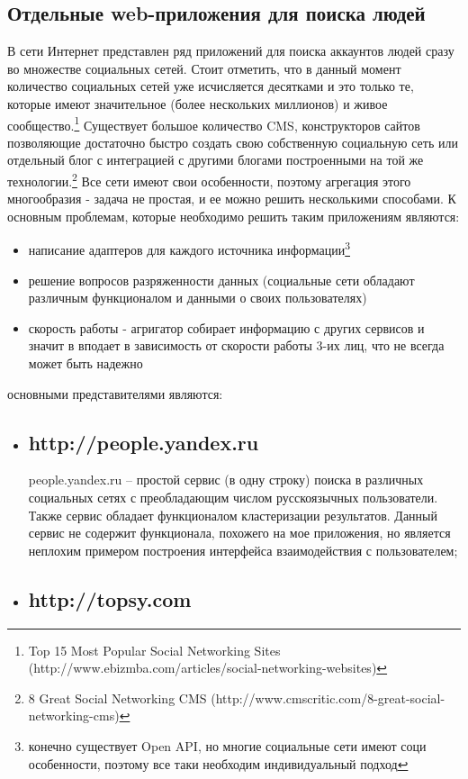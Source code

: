 \begin{chap1}
\subsection{Отдельные web-приложения для поиска людей}
В сети Интернет представлен ряд приложений для поиска аккаунтов людей сразу во множестве социальных сетей. Стоит отметить, что в данный момент количество социальных сетей уже исчисляется десятками и это только те, которые имеют значительное (более нескольких миллионов) и живое сообщество.\footnote{Top 15 Most Popular Social Networking Sites (http://www.ebizmba.com/articles/social-networking-websites)}
 Существует большое количество CMS,%
конструкторов сайтов позволяющие достаточно быстро создать свою собственную социальную сеть или отдельный блог с интеграцией с другими блогами построенными на той же технологии.\footnote{8 Great Social Networking CMS (http://www.cmscritic.com/8-great-social-networking-cms)} 
Все сети имеют свои особенности,  поэтому агрегация этого многообразия - задача не простая, и ее можно решить несколькими способами. К основным проблемам, которые необходимо решить таким приложениям являются:
\begin{itemize}
\item написание адаптеров для каждого источника информации\footnote{конечно существует Open API, но многие социальные сети имеют соци особенности, поэтому все таки необходим индивидуальный подход}
\item решение вопросов разряженности данных (социальные сети обладают различным функционалом и данными о своих пользователях)
\item скорость работы - агригатор собирает информацию с других сервисов и значит в вподает в зависимость от скорости работы 3-их лиц, что не всегда может быть надежно
\end{itemize}
основными представителями являются:
\begin{itemize}
\item \subsection{http://people.yandex.ru} %
people.yandex.ru – простой сервис (в одну строку) поиска в различных социальных сетях с преобладающим числом  русскоязычных пользователи. Также сервис обладает функционалом кластеризации результатов.  Данный сервис не содержит функционала,  похожего на мое приложения, но является неплохим примером построения интерфейса взаимодействия с пользователем;
\item \subsection{http://topsy.com}

\end{itemize}
\end{chap1}
